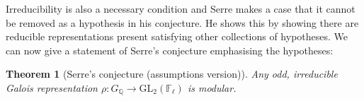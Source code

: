 \documentclass{article}
\newtheorem{thm}{Theorem}[section]
\theoremstyle{definition}
\theoremstyle{definition}
\theoremstyle{definition}
\newcommand{\GL}{\operatorname{GL}}
\newcommand{\Z}{\mathbb{Z}}
\newcommand{\Q}{\mathbb{Q}}
\begin{document}
Irreducibility is also a necessary condition and Serre \cite{Serre} makes a case that it cannot be removed as a hypothesis in his conjecture. He shows this by showing there are reducible representations present satisfying other collections of hypotheses.
\newline\newline
We can now give a statement of Serre's conjecture emphasising the hypotheses:

\begin{thm}[Serre's conjecture (assumptions version)] 
    Any odd, irreducible Galois representation 
    \( \rho : G_{\mathbb{Q}} \to \mathrm{GL}_2(\mathbb{F}_\ell) \)
    is modular.
\end{thm}
















\end{document}
